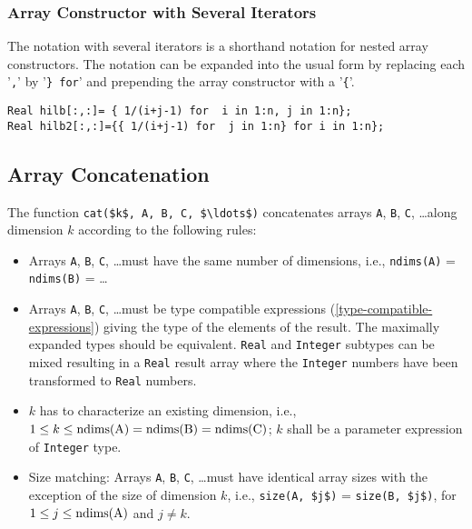 \subsubsection{Array Constructor with Several Iterators}

The notation with several iterators is a shorthand notation for nested
array constructors. The notation can be expanded into the usual form by
replacing each '\lstinline!,!' by '\lstinline!} for!' and prepending the array constructor with
a '\lstinline!{!'.

\begin{example}
\begin{lstlisting}[language=modelica]
Real hilb[:,:]= { 1/(i+j-1) for  i in 1:n, j in 1:n};
Real hilb2[:,:]={{ 1/(i+j-1) for  j in 1:n} for i in 1:n};
\end{lstlisting}
\end{example}

\subsection{Array Concatenation}

The function \lstinline!cat($k$, A, B, C, $\ldots$)! concatenates arrays
\lstinline!A!, \lstinline!B!, \lstinline!C!, \ldots along
dimension $k$ according to the following rules:
\begin{itemize}
\item
  Arrays \lstinline!A!, \lstinline!B!, \lstinline!C!, \ldots must have the same number of dimensions, i.e.,
  \lstinline!ndims(A)! = \lstinline!ndims(B)! = \ldots
\item
  Arrays \lstinline!A!, \lstinline!B!, \lstinline!C!, \ldots must be type compatible expressions (\autoref{type-compatible-expressions})
  giving the type of the elements of the result. The maximally expanded
  types should be equivalent. \lstinline!Real! and \lstinline!Integer! subtypes can be mixed
  resulting in a \lstinline!Real! result array where the \lstinline!Integer! numbers have been
  transformed to \lstinline!Real! numbers.
\item
  $k$ has to characterize an existing dimension, i.e., $1 \leq k \leq \text{\lstinline!ndims(A)!} = \text{\lstinline!ndims(B)!} = \text{\lstinline!ndims(C)!}$; $k$ shall be a parameter expression of \lstinline!Integer! type.
\item
  Size matching: Arrays \lstinline!A!, \lstinline!B!, \lstinline!C!, \ldots must have identical array sizes
  with the exception of the size of dimension $k$, i.e., \lstinline!size(A, $j$)! =
  \lstinline!size(B, $j$)!, for $1 \leq j \leq \text{\lstinline!ndims(A)!}$ and $j \neq k$.
\end{itemize}

